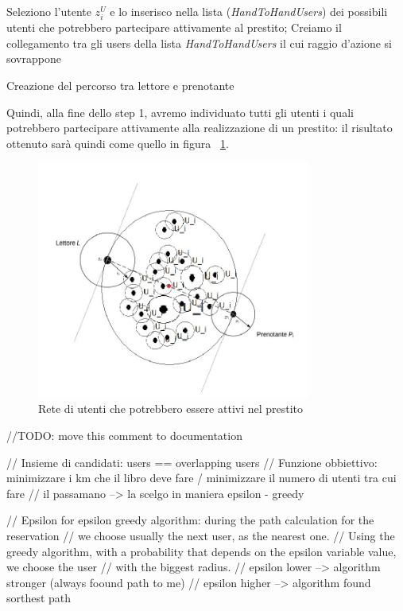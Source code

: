 \begin{itemize}
\begin{itemize}
\begin{algorithm}[H]
{{				Seleziono l'utente $ z_{i}^U $ e lo inserisco nella lista (\textit{HandToHandUsers}) dei possibili utenti che potrebbero partecipare attivamente al prestito;
			}
			}
			Creiamo il collegamento tra gli users della lista \textit{HandToHandUsers} il cui raggio d'azione si sovrappone\;
			\caption{Creazione del percorso tra lettore e prenotante}
		\end{algorithm}
		
		Quindi, alla fine dello step 1, avremo individuato tutti gli utenti i quali potrebbero partecipare attivamente alla realizzazione di un prestito: il risultato ottenuto sarà quindi come quello in figura ~\ref{fig:UsersNet}.
						
		\begin{figure}[h!]
			\centering
			\includegraphics[width=0.8\textwidth]{Immagini/Algorithm_UsersNet}
			\caption{Rete di utenti che potrebbero essere attivi nel prestito}
			\label{fig:UsersNet}
		\end{figure}
		
	\end{itemize}
\end{itemize}

//TODO: move this comment to documentation

// Insieme di candidati: users == overlapping users
// Funzione obbiettivo: minimizzare i km che il libro deve fare / minimizzare il numero di utenti tra cui fare
// il passamano --> la scelgo in maniera epsilon - greedy


// Epsilon for epsilon greedy algorithm: during the path calculation for the reservation
// we choose usually the next user, as the nearest one.
// Using the greedy algorithm, with a probability that depends on the epsilon variable value, we choose the user
// with the biggest radius.
// epsilon lower --> algorithm stronger (always foound path to me)
// epsilon higher --> algorithm found sorthest path